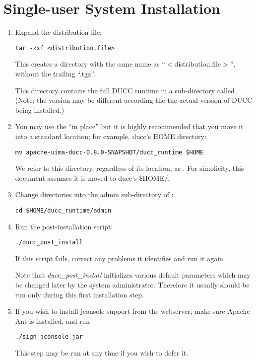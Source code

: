 \section{Single-user System Installation}
\label{subsec:install.single-user}
    \begin{enumerate}
      \item Expand the distribution file:
\begin{verbatim}
tar -zxf <distribution.file>
\end{verbatim}

        This creates a directory with the same name as ``$<$distribution.file$>$'', without the trailing ``.tgz''.
  
        This directory contains the full DUCC runtime in a sub-directory called \duccruntime.  (Note:
        the version may be different according the the actual version of DUCC being installed.)

      \item You may use the \duccruntime ``in place'' but it is highly recommended that you move it
        into a standard location; for example, ducc's HOME directory:
\begin{verbatim}
mv apache-uima-ducc-0.8.0-SNAPSHOT/ducc_runtime $HOME
\end{verbatim}

        We refer to this directory, regardless of its location, as \duccruntime. For simplicity,
        this document assumes it is moved to ducc's \$HOME/\duccruntime.

      \item Change directories into the admin sub-directory of  \duccruntime: 
\begin{verbatim}
cd $HOME/ducc_runtime/admin
\end{verbatim}

        \item Run the post-installation script: 
\begin{verbatim}
./ducc_post_install
\end{verbatim}
          If this script fails, correct any problems it identifies and run it again.

          Note that {\em ducc\_post\_install} initializes various default parameters which 
          may be changed later by the system administrator.  Therefore it usually should be
          run only during this first installation step.

        \item If you wish to install jconsole support from the webserver, make sure Apache Ant
          is installed, and run
\begin{verbatim}
./sign_jconsole_jar
\end{verbatim}
          This step may be run at any time if you wish to defer it.

   \end{enumerate}

